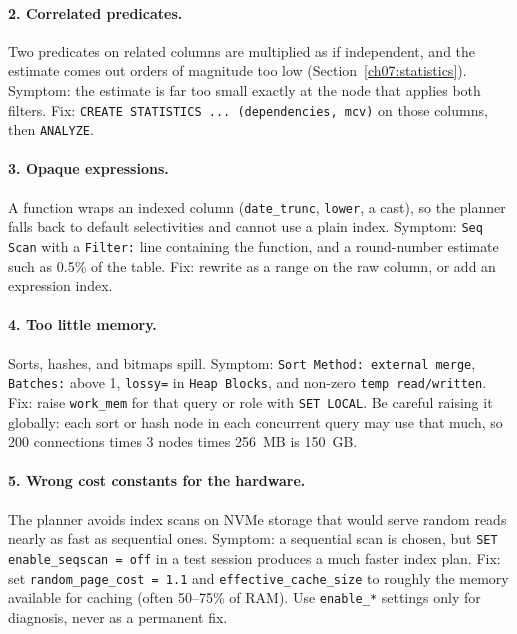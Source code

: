 \paragraph{2. Correlated predicates.} Two predicates on related columns are multiplied as if independent, and the estimate comes out orders of magnitude too low (Section~\ref{ch07:statistics}). Symptom: the estimate is far too small exactly at the node that applies both filters. Fix: \texttt{CREATE STATISTICS ... (dependencies, mcv)} on those columns, then \texttt{ANALYZE}.

\paragraph{3. Opaque expressions.} A function wraps an indexed column (\texttt{date\_trunc}, \texttt{lower}, a cast), so the planner falls back to default selectivities and cannot use a plain index. Symptom: \texttt{Seq Scan} with a \texttt{Filter:} line containing the function, and a round-number estimate such as 0.5\% of the table. Fix: rewrite as a range on the raw column, or add an expression index.

\paragraph{4. Too little memory.} Sorts, hashes, and bitmaps spill. Symptom: \texttt{Sort Method: external merge}, \texttt{Batches:} above 1, \texttt{lossy=} in \texttt{Heap Blocks}, and non-zero \texttt{temp read/written}. Fix: raise \texttt{work\_mem} for that query or role with \texttt{SET LOCAL}. Be careful raising it globally: each sort or hash node in each concurrent query may use that much, so 200 connections times 3 nodes times 256~MB is 150~GB.

\paragraph{5. Wrong cost constants for the hardware.} The planner avoids index scans on NVMe storage that would serve random reads nearly as fast as sequential ones. Symptom: a sequential scan is chosen, but \texttt{SET enable\_seqscan = off} in a test session produces a much faster index plan. Fix: set \texttt{random\_page\_cost = 1.1} and \texttt{effective\_cache\_size} to roughly the memory available for caching (often 50--75\% of RAM). Use \texttt{enable\_*} settings only for diagnosis, never as a permanent fix.

